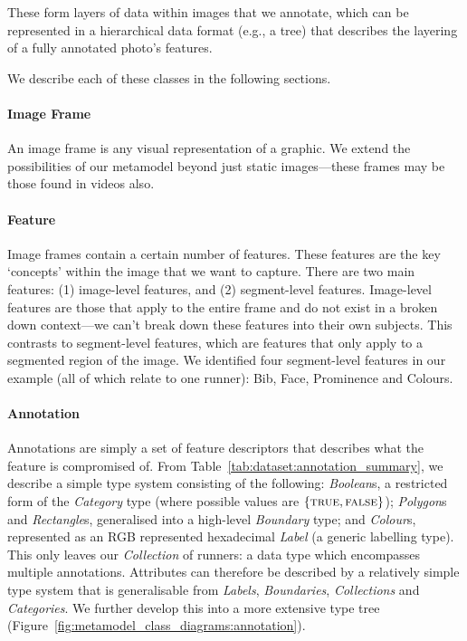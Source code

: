 These form layers of data within images that we annotate, which can be represented in a hierarchical data format (e.g., a tree) that describes the layering of a fully annotated photo's features.

We describe each of these classes in the following sections.

\paragraph{Image Frame}

An image frame is any visual representation of a graphic. We extend the possibilities of our metamodel beyond just static images---these frames may be those found in videos also.

\paragraph{Feature}

Image frames contain a certain number of features. These features are the key `concepts' within the image that we want to capture. There are two main features: (1) image-level features, and (2) segment-level features. Image-level features are those that apply to the entire frame and do not exist in a broken down context---we can't break down these features into their own subjects. This contrasts to segment-level features, which are features that only apply to a segmented region of the image. We identified four segment-level features in our example (all of which relate to one runner): Bib, Face, Prominence and Colours.

\paragraph{Annotation}

Annotations are simply a set of feature descriptors that describes what the feature is compromised of. From Table~\ref{tab:dataset:annotation_summary}, we describe a simple type system consisting of the following: \textit{Boolean}s, a restricted form of the \textit{Category} type (where possible values are $\{ \textsc{true}, \textsc{false} \}$); \textit{Polygon}s and \textit{Rectangle}s, generalised into a high-level \textit{Boundary} type; and \textit{Colour}s, represented as an RGB represented hexadecimal \textit{Label} (a generic labelling type). This only leaves our \textit{Collection} of runners: a data type which encompasses multiple annotations. Attributes can therefore be described by a relatively simple type system that is generalisable from \textit{Labels}, \textit{Boundaries}, \textit{Collections} and \textit{Categories}. We further develop this into a more extensive type tree (Figure~\ref{fig:metamodel_class_diagrams:annotation}).

